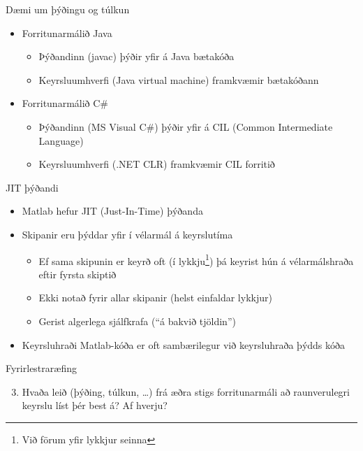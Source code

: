 \documentclass[handout]{beamer}
\begin{document}
\begin{frame}{Dæmi um þýðingu og túlkun}
\begin{itemize}
 \item Forritunarmálið Java
 \begin{itemize}
  \item Þýðandinn (javac) þýðir yfir á Java bætakóða
  \item Keyrsluumhverfi (Java virtual machine) framkvæmir bætakóðann
 \end{itemize}
\end{itemize}
\begin{itemize}
 \item Forritunarmálið C\#
 \begin{itemize}
  \item Þýðandinn (MS Visual C\#) þýðir yfir á CIL (Common Intermediate Language)
  \item Keyrsluumhverfi (.NET CLR) framkvæmir CIL forritið
 \end{itemize}
\end{itemize}
\end{frame}

\begin{frame}{JIT þýðandi}
\begin{itemize}
 \item Matlab hefur JIT (Just-In-Time) þýðanda
 \item Skipanir eru þýddar yfir í vélarmál á keyrslutíma
 \begin{itemize}
  \item Ef sama skipunin er keyrð oft (í lykkju\footnote{Við förum yfir lykkjur seinna}) þá keyrist hún á vélarmálshraða eftir fyrsta skiptið
  \item Ekki notað fyrir allar skipanir (helst einfaldar lykkjur)
  \item Gerist algerlega sjálfkrafa (``á bakvið tjöldin'')
 \end{itemize}
 \item Keyrsluhraði Matlab-kóða er oft sambærilegur við keyrsluhraða þýdds kóða
\end{itemize}
\end{frame}

\begin{frame}{Fyrirlestraræfing}
    \begin{enumerate}
    \setcounter{enumi}{2}
     \item Hvaða leið (þýðing, túlkun, \ldots) frá æðra stigs forritunarmáli að raunverulegri keyrslu líst þér best á? Af hverju?
    \end{enumerate}
\end{frame}
\end{document}
